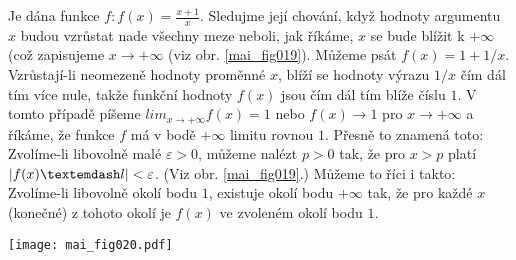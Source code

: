 \wikitextrule
\begin{example}\label{MAI:exam031}
  Je dána funkce \(f: f(x) = \frac{x + 1}{x}\). Sledujme její chování, když hodnoty argumentu \(x\) 
  budou vzrůstat 
  nade všechny meze neboli, jak říkáme, \(x\) se bude blížit k \(+\infty\) (což zapisujeme \(x \to 
  + \infty\) (viz obr. \ref{mai_fig019}). Můžeme psát \(f(x) = 1 + 1/x\). Vzrůstají-li neomezeně 
  hodnoty proměnné \(x\), blíží se hodnoty výrazu \(1/x\) čím dál tím více nule, takže funkční 
  hodnoty \(f(x)\) jsou čím dál tím blíže číslu \(1\). V tomto případě píšeme \(lim_{x\to+\infty} 
  f(x) = 1\) nebo \(f(x) \to 1\) pro \(x\to +\infty\) a říkáme, že funkce \(f\) má v bodě 
  \(+\infty\) limitu rovnou \(1\). Přesně to znamená toto: Zvolíme-li libovolně malé \(\varepsilon 
  > 0\), můžeme nalézt \(p > 0\) tak, že pro \(x > p\) platí \(\abs{f(x) — l} < \varepsilon\). (Viz 
  obr. \ref{mai_fig019}.) Můžeme to říci i takto: Zvolíme-li libovolně okolí bodu \(1\), existuje 
  okolí bodu \(+\infty\) tak, že pro každé \(x\) (konečné) z tohoto okolí je \(f(x)\) ve zvoleném 
  okolí bodu \(1\).
  
  {\centering
   \captionsetup{type=figure}
%   
   \texttt{[image: mai\_fig020.pdf]}
  \par}
\end{example}















